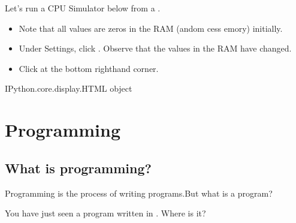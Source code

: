 \documentclass[letterpaper,10pt,english]{sphinxmanual}
\begin{document}
Let’s run a CPU Simulator below from a .
\begin{itemize}
\item {} 
Note that all values are zeros in the RAM (andom cess emory) initially.

\item {} 
Under Settings, click . Observe that the values in the RAM have changed.

\item {} 
Click  at the bottom right\sphinxhyphen{}hand corner.

\end{itemize}

\begin{sphinxVerbatim}[commandchars=\\\{\}]
   
\end{sphinxVerbatim}

\begin{sphinxVerbatim}[commandchars=\\\{\}]
\PYGZlt{}IPython.core.display.HTML object\PYGZgt{}
\end{sphinxVerbatim}


\section{Programming}
\label{\detokenize{Lecture1/Introduction to Computer Programming:programming}}

\subsection{What is programming?}
\label{\detokenize{Lecture1/Introduction to Computer Programming:what-is-programming}}
Programming is the process of writing programs.But what is a program?

 You have just seen a program written in . Where is it?
\end{document}
